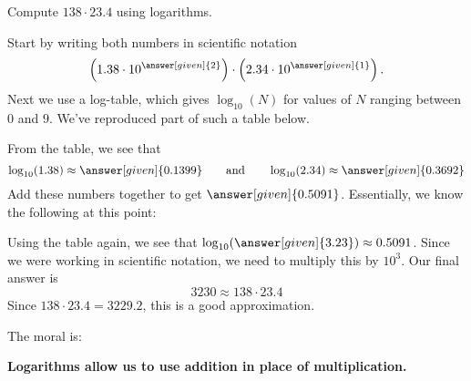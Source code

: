 \documentclass{ximera}
\begin{document}
\begin{example}
  Compute $138\cdot 23.4$ using logarithms.
  \begin{explanation}
    Start by writing both numbers in scientific notation
    \[
    \left(1.38\cdot 10^{\answer[given]{2}}\right)\cdot \left(2.34 \cdot 10^{\answer[given]{1}}\right).
    \]
    Next we use a log-table, which gives $\log_{10}(N)$ for values of
    $N$ ranging between $0$ and $9$. We've reproduced part of such a
    table below.
    \begin{image}
    \end{image}
    From the table, we see that 
    \[
    \log_{10}(1.38) \approx \answer[given]{0.1399}\qquad\text{and}\qquad \log_{10}(2.34)\approx \answer[given]{0.3692}
    \]
    Add these numbers together to get $\answer[given]{0.5091}$.
    Essentially, we know the following at this point:
    \begin{center}
    \end{center}
    Using the table again, we see that
    $\log_{10}(\answer[given]{3.23})\approx 0.5091$. Since we were
    working in scientific notation, we need to multiply this by
    $10^3$. Our final answer is
    \[
    3230 \approx 138\cdot 23.4
    \]
    Since $138\cdot 23.4 = 3229.2$, this is a good approximation.
  \end{explanation}
\end{example}
The moral is:
\begin{center}
      \textbf{Logarithms allow us to use addition in place of multiplication.}
\end{center}
\end{document}
